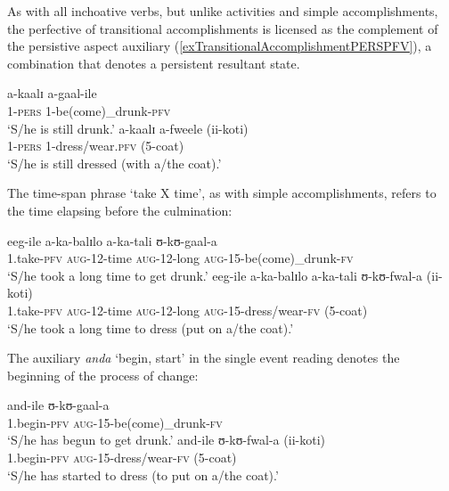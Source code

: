 As with all inchoative verbs, but unlike activities and simple accomplishments, the perfective of transitional accomplishments is licensed as the complement of the persistive aspect auxiliary (\ref{exTransitionalAccomplishmentPERSPFV}), a combination that denotes a persistent resultant state.
\begin{exe}
\ex \label{exTransitionalAccomplishmentPERSPFV}\begin{xlist}
\ex\gll a-kaalɪ a-gaal-ile\\
1-\textsc{pers} 1-be(come)\_drunk-\textsc{pfv}\\
\glt `S/he is still drunk.'
\ex \gll a-kaalɪ a-fweele \textup{(}ii-koti\textup{)}\\
1-\textsc{pers} 1-dress/wear.\textsc{pfv} (5-coat)\\
\glt `S/he is still dressed (with a/the coat).'
\end{xlist}
\end{exe}

The time-span phrase \lq take X time', as with simple accomplishments, refers to the time elapsing before the culmination:
\begin{exe}
\ex \begin{xlist}
\ex \gll eeg-ile a-ka-balɪlo a-ka-tali ʊ-kʊ-gaal-a\\
1.take-\textsc{pfv} \textsc{aug}-12-time \textsc{aug}-12-long \textsc{aug}-15-be(come)\_drunk-\textsc{fv}\\
\glt \lq S/he took a long time to get drunk.'
\ex \gll eeg-ile a-ka-balɪlo a-ka-tali ʊ-kʊ-fwal-a \textup{(}ii-koti\textup{)}\\
1.take-\textsc{pfv} \textsc{aug}-12-time \textsc{aug}-12-long \textsc{aug}-15-dress/wear-\textsc{fv} (5-coat)\\
\glt \lq S/he took a long time to dress (put on a/the coat).'
\end{xlist}
\end{exe}

The auxiliary \textit{anda} \lq begin, start' in the single event reading denotes the beginning of the process of change:
\begin{exe}
\ex\begin{xlist}
\ex \gll and-ile ʊ-kʊ-gaal-a\\
1.begin-\textsc{pfv} \textsc{aug}-15-be(come)\_drunk-\textsc{fv}\\
\glt \lq S/he has begun to get drunk.'
\ex \gll and-ile ʊ-kʊ-fwal-a \textup{(}ii-koti\textup{)}\\
1.begin-\textsc{pfv} \textsc{aug}-15-dress/wear-\textsc{fv} (5-coat)\\
\glt \lq S/he has started to dress (to put on a/the coat).'
\end{xlist}
\end{exe}

